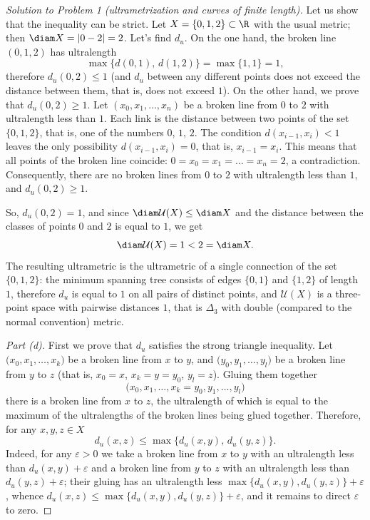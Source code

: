 \documentclass[a4paper,12pt]{report}
\begin{document}
\begin{proof}[Solution to Problem \textup{1} \textup{(}ultrametrization and curves of finite length\textup{)}]
Let us show that the inequality can be strict. Let $X=\{0,1,2\}\subset\R$ with the usual metric\textup{;} then $\diam X=|0-2|=2$. Let's find $d_u$. On the one hand, the broken line $(0,1,2)$ has ultralength
\[
\max\{d(0,1),\,d(1,2)\}=\max\{1,1\}=1 ,
\]
therefore $d_u(0,2)\le 1$ \textup{(}and $d_u$ between any different points does not exceed the distance between them, that is, does not exceed $1$\textup{)}. On the other hand, we prove that $d_u(0,2)\ge 1$. Let $(x_0,x_1,\dots,x_n)$ be a broken line from $0$ to $2$ with ultralength less than $1$. Each link is the distance between two points of the set $\{0,1,2\}$, that is, one of the numbers $0$, $1$, $2$. The condition $d(x_{i-1},x_i)<1$ leaves the only possibility $d(x_{i-1},x_i)=0$, that is, $x_{i-1}=x_i$. This means that all points of the broken line coincide\textup{:} $0=x_0=x_1=\dots=x_n=2$, a contradiction. Consequently, there are no broken lines from $0$ to $2$ with ultralength less than $1$, and $d_u(0,2)\ge 1$.

So, $d_u(0,2)=1$, and since $\diam\mathcal U(X)\le\diam X$ and the distance between the classes of points $0$ and $2$ is equal to $1$, we get
\[
\diam\mathcal U(X)=1<2=\diam X .
\]
The resulting ultrametric is the ultrametric of a single connection of the set $\{0,1,2\}$\textup{:} the minimum spanning tree consists of edges $\{0,1\}$ and $\{1,2\}$ of length $1$, therefore $d_u$ is equal to $1$ on all pairs of distinct points, and $\mathcal U(X)$ is a three-point space with pairwise distances $1$, that is $\Delta_3$ with double \textup{(}compared to the normal convention\textup{)} metric.

\textit{Part \textup{(d)}.} First we prove that $d_u$ satisfies the strong triangle inequality. Let $\bigl(x_0,x_1,\dots,x_k\bigr)$ be a broken line from $x$ to $y$, and $\bigl(y_0,y_1,\dots,y_l\bigr)$ be a broken line from $y$ to $z$ \textup{(}that is, $x_0=x$, $x_k=y=y_0$, $y_l=z$\textup{)}. Gluing them together
\[
\bigl(x_0,x_1,\dots,x_k=y_0,y_1,\dots,y_l\bigr)
\]
there is a broken line from $x$ to $z$, the ultralength of which is equal to the maximum of the ultralengths of the broken lines being glued together. Therefore, for any $x,y,z\in X$
\[
d_u(x,z)\le\max\bigl\{d_u(x,y),\,d_u(y,z)\bigr\} .
\]
Indeed, for any $\varepsilon>0$ we take a broken line from $x$ to $y$ with an ultralength less than $d_u(x,y)+\varepsilon$ and a broken line from $y$ to $z$ with an ultralength less than $d_u(y,z)+\varepsilon$\textup{;} their gluing has an ultralength less $\max\{d_u(x,y),d_u(y,z)\}+\varepsilon$, whence $d_u(x,z)\le\max\{d_u(x,y),d_u(y,z)\}+\varepsilon$, and it remains to direct $\varepsilon$ to zero.


\end{proof}
\end{document}
